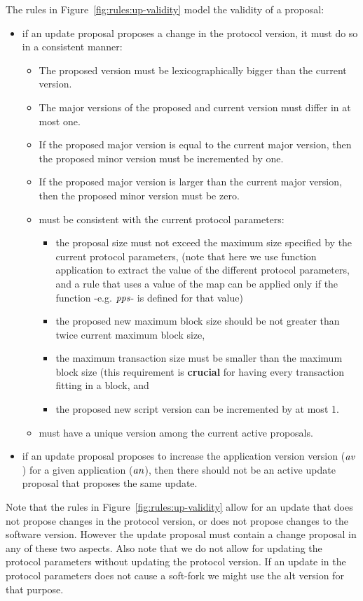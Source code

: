 The rules in Figure~\ref{fig:rules:up-validity} model the validity of a proposal:
\begin{itemize}
\item if an update proposal proposes a change in the protocol version, it must
  do so in a consistent manner:
  \begin{itemize}
  \item The proposed version must be lexicographically bigger than the
    current version.
  \item The major versions of the proposed and current version must differ in
    at most one.
  \item If the proposed major version is equal to the current major
    version, then the proposed minor version must be incremented by one.
  \item If the proposed major version is larger than the current major version,
    then the proposed minor version must be zero.
  \item must be consistent with the current protocol parameters:
    \begin{itemize}
    \item the proposal size must not exceed the maximum size specified by the
      current protocol parameters, (note that here we use function application
      to extract the value of the different protocol parameters, and a rule
      that uses a value of the map can be applied only if the function -e.g.
      $\mathit{pps}$- is defined for that value)
    \item the proposed new maximum block size should be not greater than twice
      current maximum block size,
    \item the maximum transaction size must be smaller than the maximum block
      size (this requirement is \textbf{crucial} for having every transaction
      fitting in a block, and
    \item the proposed new script version can be incremented by at most 1.
    \end{itemize}
  \item must have a unique version among the current active proposals.
  \end{itemize}
\item if an update proposal proposes to increase the application version
  version ($\mathit{av}$) for a given application ($\mathit{an}$), then there should
  not be an active update proposal that proposes the same update.
\end{itemize}
Note that the rules in Figure~\ref{fig:rules:up-validity} allow for an update
that does not propose changes in the protocol version, or does not propose
changes to the software version. However the update proposal must contain a change
proposal in any of these two aspects.
%
Also note that we do not allow for updating the protocol parameters without
updating the protocol version. If an update in the protocol parameters does not
cause a soft-fork we might use the alt version for that purpose.

